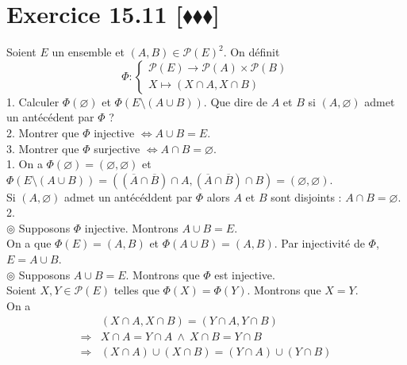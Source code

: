 \documentclass[10pt]{article}
\begin{document}
\section*{Exercice 15.11 [$\blacklozenge\blacklozenge\blacklozenge$]}
\begin{tcolorbox}[enhanced, width=7.6in, center, size=fbox, fontupper=\large, drop shadow southwest]
    Soient $E$ un ensemble et $(A,B)\in\mathcal{P}(E)^2$. On définit
    \begin{equation*}
        \varPhi : \begin{cases}\mathcal{P}(E) \to \mathcal{P}(A) \times \mathcal{P}(B)\\X \mapsto (X \cap A, X \cap B)\end{cases}
    \end{equation*}
    1. Calculer $\varPhi(\varnothing)$ et $\varPhi(E \setminus (A \cup B))$. Que dire de $A$ et $B$ si $(A, \varnothing)$ admet un antécédent par $\varPhi$ ?\\
    2. Montrer que $\varPhi$ injective $\iff A \cup B = E$.\\
    3. Montrer que $\varPhi$ surjective $\iff A \cap B = \varnothing$.\\[0.2cm]
    1. On a $\varPhi(\varnothing) = (\varnothing, \varnothing)$ et $\varPhi(E \setminus (A \cup B)) = ((\overline{A} \cap \overline{B}) \cap A, (\overline{A} \cap \overline{B}) \cap B) = (\varnothing, \varnothing)$.\\
    Si $(A, \varnothing)$ admet un antécéddent par $\varPhi$ alors $A$ et $B$ sont disjoints : $A \cap B = \varnothing$.\\[0.15cm]
    2.\\
    $\circledcirc$ Supposons $\varPhi$ injective. Montrons $A \cup B = E$.\\
    On a que $\varPhi(E) = (A,B)$ et $\varPhi(A \cup B)=(A,B)$. Par injectivité de $\varPhi$, $E = A \cup B$.\\[0.1cm]
    $\circledcirc$ Supposons $A \cup B = E$. Montrons que $\varPhi$ est injective.\\
    Soient $X,Y \in \mathcal{P}(E)$ telles que $\varPhi(X) = \varPhi(Y)$. Montrons que $X = Y$.\\
    On a
    \begin{align*}
        &(X \cap A, X \cap B) = (Y \cap A, Y \cap B)\\
        \Longrightarrow&X\cap A = Y \cap A ~ \wedge ~ X \cap B = Y \cap B\\
        \Longrightarrow& (X \cap A) \cup (X \cap B) = (Y \cap A) \cup (Y \cap B)\\

\end{align*}
\end{tcolorbox}
\end{document}
